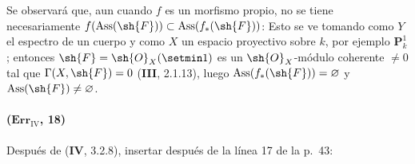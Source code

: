 \begin{remark}[3.1.10.5]
\label{IV.3.1.10.5}
Se observará que, aun cuando $f$ es un morfismo propio, no se tiene
necesariamente
$f(\operatorname{Ass}(\sh{F}))\subset\operatorname{Ass}(f_*(\sh{F}))$:
Esto se ve tomando como $Y$ el espectro de un cuerpo y como $X$ un
espacio proyectivo sobre $k$, por ejemplo $\mathbf P^1_k$; entonces
$\sh{F}=\sh{O}_X(\setmin 1)$ es un $\sh{O}_X$-módulo coherente $\neq0$ tal
que $\Gamma(X,\sh{F})=0$ (\textbf{III}, 2.1.13), luego
$\operatorname{Ass}(f_*(\sh{F}))=\varnothing$ y
$\operatorname{Ass}(\sh{F})\neq\varnothing$.
\end{remark}

\paragraph{($\mathbf{Err}_{\mathrm{IV}}$, 18)}
Después de (\textbf{IV}, 3.2.8), insertar después de la línea 17 de la p.~43:

